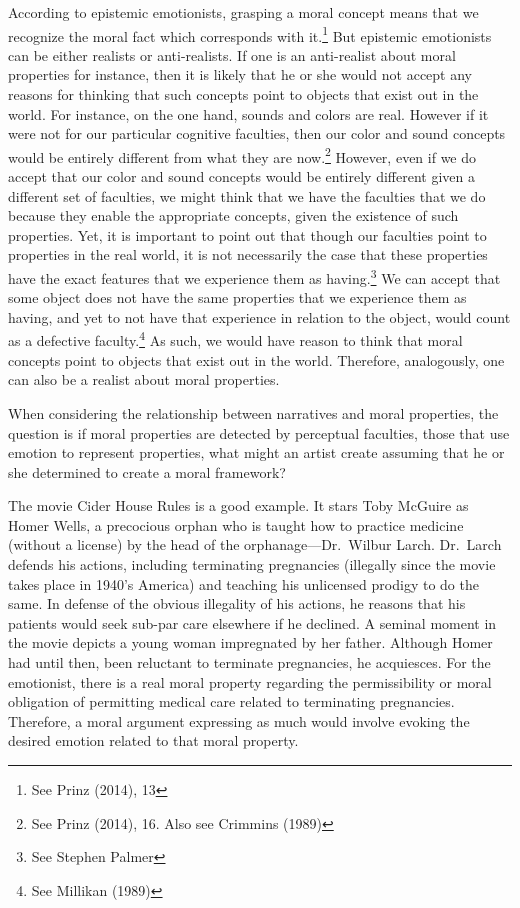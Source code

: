 \documentclass[
  letterpaper,
  DIV=11,
  numbers=noendperiod]{scrartcl}
\theoremstyle{remark}
\begin{document}
According to epistemic emotionists, grasping a moral concept means that
we recognize the moral fact which corresponds with it.\footnote{See
  Prinz (2014), 13} But epistemic emotionists can be either realists or
anti-realists. If one is an anti-realist about moral properties for
instance, then it is likely that he or she would not accept any reasons
for thinking that such concepts point to objects that exist out in the
world. For instance, on the one hand, sounds and colors are real.
However if it were not for our particular cognitive faculties, then our
color and sound concepts would be entirely different from what they are
now.\footnote{See Prinz (2014), 16. Also see Crimmins (1989)} However,
even if we do accept that our color and sound concepts would be entirely
different given a different set of faculties, we might think that we
have the faculties that we do because they enable the appropriate
concepts, given the existence of such properties. Yet, it is important
to point out that though our faculties point to properties in the real
world, it is not necessarily the case that these properties have the
exact features that we experience them as having.\footnote{See Stephen
  Palmer} We can accept that some object does not have the same
properties that we experience them as having, and yet to not have that
experience in relation to the object, would count as a defective
faculty.\footnote{See Millikan (1989)} As such, we would have reason to
think that moral concepts point to objects that exist out in the world.
Therefore, analogously, one can also be a realist about moral
properties.

When considering the relationship between narratives and moral
properties, the question is if moral properties are detected by
perceptual faculties, those that use emotion to represent properties,
what might an artist create assuming that he or she determined to create
a moral framework?

The movie Cider House Rules is a good example. It stars Toby McGuire as
Homer Wells, a precocious orphan who is taught how to practice medicine
(without a license) by the head of the orphanage---Dr.~Wilbur Larch.
Dr.~Larch defends his actions, including terminating pregnancies
(illegally since the movie takes place in 1940's America) and teaching
his unlicensed prodigy to do the same. In defense of the obvious
illegality of his actions, he reasons that his patients would seek
sub-par care elsewhere if he declined. A seminal moment in the movie
depicts a young woman impregnated by her father. Although Homer had
until then, been reluctant to terminate pregnancies, he acquiesces. For
the emotionist, there is a real moral property regarding the
permissibility or moral obligation of permitting medical care related to
terminating pregnancies. Therefore, a moral argument expressing as much
would involve evoking the desired emotion related to that moral
property.
\end{document}
